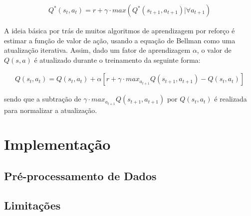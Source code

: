 \begin{eqnarray}
	Q^{*}(s_t, a_t)= r + \gamma \cdot max(Q^{*}(s_{t+1},a_{t+1})|\forall a_{t+1})
\end{eqnarray}

A ideia básica por trás de muitos algoritmos de aprendizagem por reforço é estimar a função de valor de ação, usando a equação de Bellman como uma atualização iterativa. Assim, dado um fator de aprendizagem $\alpha$, o valor de $Q(s,a)$ é atualizado durante o treinamento da seguinte forma:

\begin{eqnarray}
	Q(s_t,a_t) = Q(s_t,a_t) + \alpha[r + \gamma\cdot max_{a_{t+1}}Q(s_{t+1},a_{t+1}) - Q(s_t,a_t)]
\end{eqnarray}

sendo que a subtração de $\gamma\cdot max_{a_{t+1}}Q(s_{t+1},a_{t+1})$ por $Q(s_t,a_t)$ é realizada para normalizar a atualização.


\section{Implementação} %
\label{sec:implementacao}

\subsection{Pré-processamento de Dados} %
\label{sub:preprocessamento}


\subsection{Limitações} %
\label{sub:limitacoes}


